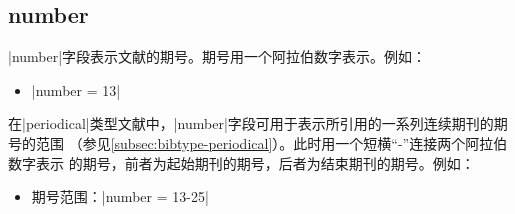 

\subsection{number}\label{subsec:bibfield-number}

|number|字段表示文献的期号。期号用一个阿拉伯数字表示。例如：
\begin{itemize}
\item |number = {13}|
\end{itemize}

在|periodical|类型文献中，|number|字段可用于表示所引用的一系列连续期刊的期号的范围
（参见\ref{subsec:bibtype-periodical}）。此时用一个短横``-''连接两个阿拉伯数字表示
的期号，前者为起始期刊的期号，后者为结束期刊的期号。例如：
\begin{itemize}
\item 期号范围：|number = {13-25}|
\end{itemize}
